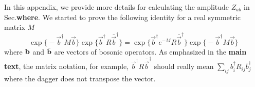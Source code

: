
In this appendix, we provide more details for calculating the amplitude $Z_{ab}$ in Sec.{\bf\color{red}where}. We started to prove the following identity for a real symmetric matrix $M$
\begin{equation}
\label{eq:first_id_app_pf_of_id}
\exp\Big\{- \vec{b}^{\dagger} M \vec{b}  \Big\} \exp \Big\{ \vec{b}^{\dagger} R \bar{\vec{b}}^{\dagger}  \Big\}  = \exp \Big\{ \vec{b}^{\dagger} e^{-M}  R \bar{\vec{b}}^{\dagger}  \Big\} \exp\Big\{- \vec{b}^{\dagger} M \vec{b}  \Big\} 
\end{equation}
where ${\bf b}$ and $\bar{\bf b}$ are vectors of bosonic operators. As emphasized in the {\bf\color{red}main text}, the matrix notation, for example, $\vec{b}^{\dagger} R \bar{\vec{b}}^{\dagger}$ should really mean $\sum_{ij}b^\dagger_iR_{ij}\bar{b}_j^\dagger$ where the dagger does not transpose the vector.  

